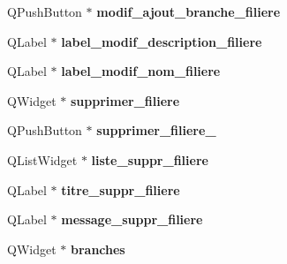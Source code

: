 \begin{DoxyCompactItemize}
\item 
\hypertarget{class_ui___administration_a2f82c2f775289be63e105f7df82c7da0}{Q\+Push\+Button $\ast$ {\bfseries modif\+\_\+ajout\+\_\+branche\+\_\+filiere}}\label{class_ui___administration_a2f82c2f775289be63e105f7df82c7da0}

\item 
\hypertarget{class_ui___administration_a9935fb36312d7a6cd1139af793024a0d}{Q\+Label $\ast$ {\bfseries label\+\_\+modif\+\_\+description\+\_\+filiere}}\label{class_ui___administration_a9935fb36312d7a6cd1139af793024a0d}

\item 
\hypertarget{class_ui___administration_a1df215105e24c73f5876fb63263b09b8}{Q\+Label $\ast$ {\bfseries label\+\_\+modif\+\_\+nom\+\_\+filiere}}\label{class_ui___administration_a1df215105e24c73f5876fb63263b09b8}

\item 
\hypertarget{class_ui___administration_ad2319d6707e7b4f54779fd308a116f68}{Q\+Widget $\ast$ {\bfseries supprimer\+\_\+filiere}}\label{class_ui___administration_ad2319d6707e7b4f54779fd308a116f68}

\item 
\hypertarget{class_ui___administration_a488ac1849c2af67047741c3abb5c8bb8}{Q\+Push\+Button $\ast$ {\bfseries supprimer\+\_\+filiere\+\_}}\label{class_ui___administration_a488ac1849c2af67047741c3abb5c8bb8}

\item 
\hypertarget{class_ui___administration_ae5d4bf5762002ce5eb7b0f83823c89b5}{Q\+List\+Widget $\ast$ {\bfseries liste\+\_\+suppr\+\_\+filiere}}\label{class_ui___administration_ae5d4bf5762002ce5eb7b0f83823c89b5}

\item 
\hypertarget{class_ui___administration_a91f042c569e9c5a557828dc5d3da20d1}{Q\+Label $\ast$ {\bfseries titre\+\_\+suppr\+\_\+filiere}}\label{class_ui___administration_a91f042c569e9c5a557828dc5d3da20d1}

\item 
\hypertarget{class_ui___administration_aacc05da92c3975affab8bbf2635cecf2}{Q\+Label $\ast$ {\bfseries message\+\_\+suppr\+\_\+filiere}}\label{class_ui___administration_aacc05da92c3975affab8bbf2635cecf2}

\item 
\hypertarget{class_ui___administration_acf804eb4bc0d6189a6903729b293272e}{Q\+Widget $\ast$ {\bfseries branches}}\label{class_ui___administration_acf804eb4bc0d6189a6903729b293272e}


\end{DoxyCompactItemize}
